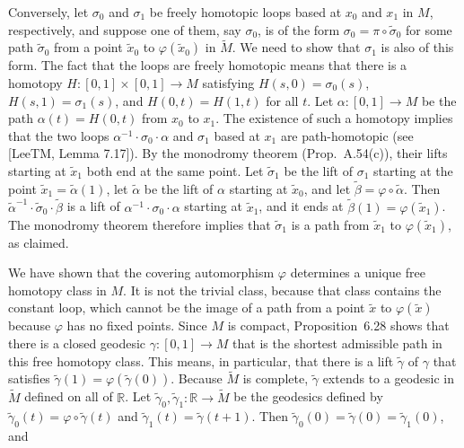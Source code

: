 \begin{lemma}
Conversely, let $\sigma_0$ and $\sigma_1$ be freely homotopic loops based at $x_0$ and $x_1$ in $M$, respectively, and suppose one of them, say $\sigma_0$, is of the form $\sigma_0 = \pi \circ \tilde{\sigma}_0$ for some path $\tilde{\sigma}_0$ from a point $\tilde{x}_0$ to $\varphi(\tilde{x}_0)$ in $\tilde{M}$. We need to show that $\sigma_1$ is also of this form. The fact that the loops are freely homotopic means that there is a homotopy $H : [0,1] \times [0,1] \to M$ satisfying $H(s,0) = \sigma_0(s)$, $H(s,1) = \sigma_1(s)$, and $H(0,t) = H(1,t)$ for all $t$. Let $\alpha : [0,1] \to M$ be the path $\alpha(t) = H(0,t)$ from $x_0$ to $x_1$. The existence of such a homotopy implies that the two loops $\alpha^{-1} \cdot \sigma_0 \cdot \alpha$ and $\sigma_1$ based at $x_1$ are path-homotopic (see [LeeTM, Lemma 7.17]). By the monodromy theorem (Prop.~A.54(c)), their lifts starting at $\tilde{x}_1$ both end at the same point. Let $\tilde{\sigma}_1$ be the lift of $\sigma_1$ starting at the point $\tilde{x}_1 = \tilde{\alpha}(1)$, let $\tilde{\alpha}$ be the lift of $\alpha$ starting at $\tilde{x}_0$, and let $\tilde{\beta} = \varphi \circ \tilde{\alpha}$. Then $\tilde{\alpha}^{-1} \cdot \tilde{\sigma}_0 \cdot \tilde{\beta}$ is a lift of $\alpha^{-1} \cdot \sigma_0 \cdot \alpha$ starting at $\tilde{x}_1$, and it ends at $\tilde{\beta}(1) = \varphi(\tilde{x}_1)$. The monodromy theorem therefore implies that $\tilde{\sigma}_1$ is a path from $\tilde{x}_1$ to $\varphi(\tilde{x}_1)$, as claimed.

We have shown that the covering automorphism $\varphi$ determines a unique free homotopy class in $M$. It is not the trivial class, because that class contains the constant loop, which cannot be the image of a path from a point $\tilde{x}$ to $\varphi(\tilde{x})$ because $\varphi$ has no fixed points. Since $M$ is compact, Proposition~6.28 shows that there is a closed geodesic $\gamma : [0,1] \to M$ that is the shortest admissible path in this free homotopy class. This means, in particular, that there is a lift $\tilde{\gamma}$ of $\gamma$ that satisfies $\tilde{\gamma}(1) = \varphi(\tilde{\gamma}(0))$. Because $\tilde{M}$ is complete, $\tilde{\gamma}$ extends to a geodesic in $\tilde{M}$ defined on all of $\mathbb{R}$. Let $\tilde{\gamma}_0, \tilde{\gamma}_1 : \mathbb{R} \to \tilde{M}$ be the geodesics defined by $\tilde{\gamma}_0(t) = \varphi \circ \tilde{\gamma}(t)$ and $\tilde{\gamma}_1(t) = \tilde{\gamma}(t + 1)$. Then $\tilde{\gamma}_0(0) = \tilde{\gamma}(0) = \tilde{\gamma}_1(0)$, and


\end{lemma}
